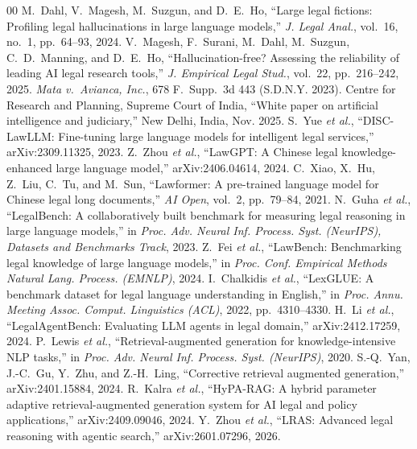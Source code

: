 \documentclass[conference]{IEEEtran}
\begin{document}
\balance

\begin{thebibliography}{00}
 M.~Dahl, V.~Magesh, M.~Suzgun, and D.~E.~Ho, ``Large legal fictions: Profiling legal hallucinations in large language models,'' \emph{J. Legal Anal.}, vol.~16, no.~1, pp.~64--93, 2024.
 V.~Magesh, F.~Surani, M.~Dahl, M.~Suzgun, C.~D.~Manning, and D.~E.~Ho, ``Hallucination-free? Assessing the reliability of leading AI legal research tools,'' \emph{J. Empirical Legal Stud.}, vol.~22, pp.~216--242, 2025.
 \emph{Mata v.\ Avianca, Inc.}, 678 F.~Supp.~3d 443 (S.D.N.Y. 2023).
 Centre for Research and Planning, Supreme Court of India, ``White paper on artificial intelligence and judiciary,'' New Delhi, India, Nov. 2025.
 S.~Yue \emph{et al.}, ``DISC-LawLLM: Fine-tuning large language models for intelligent legal services,'' arXiv:2309.11325, 2023.
 Z.~Zhou \emph{et al.}, ``LawGPT: A Chinese legal knowledge-enhanced large language model,'' arXiv:2406.04614, 2024.
 C.~Xiao, X.~Hu, Z.~Liu, C.~Tu, and M.~Sun, ``Lawformer: A pre-trained language model for Chinese legal long documents,'' \emph{AI Open}, vol.~2, pp.~79--84, 2021.
 N.~Guha \emph{et al.}, ``LegalBench: A collaboratively built benchmark for measuring legal reasoning in large language models,'' in \emph{Proc. Adv. Neural Inf. Process. Syst. (NeurIPS), Datasets and Benchmarks Track}, 2023.
 Z.~Fei \emph{et al.}, ``LawBench: Benchmarking legal knowledge of large language models,'' in \emph{Proc. Conf. Empirical Methods Natural Lang. Process. (EMNLP)}, 2024.
 I.~Chalkidis \emph{et al.}, ``LexGLUE: A benchmark dataset for legal language understanding in English,'' in \emph{Proc. Annu. Meeting Assoc. Comput. Linguistics (ACL)}, 2022, pp.~4310--4330.
 H.~Li \emph{et al.}, ``LegalAgentBench: Evaluating LLM agents in legal domain,'' arXiv:2412.17259, 2024.
 P.~Lewis \emph{et al.}, ``Retrieval-augmented generation for knowledge-intensive NLP tasks,'' in \emph{Proc. Adv. Neural Inf. Process. Syst. (NeurIPS)}, 2020.
 S.-Q.~Yan, J.-C.~Gu, Y.~Zhu, and Z.-H.~Ling, ``Corrective retrieval augmented generation,'' arXiv:2401.15884, 2024.
 R.~Kalra \emph{et al.}, ``HyPA-RAG: A hybrid parameter adaptive retrieval-augmented generation system for AI legal and policy applications,'' arXiv:2409.09046, 2024.
 Y.~Zhou \emph{et al.}, ``LRAS: Advanced legal reasoning with agentic search,'' arXiv:2601.07296, 2026.

\end{thebibliography}
\end{document}
